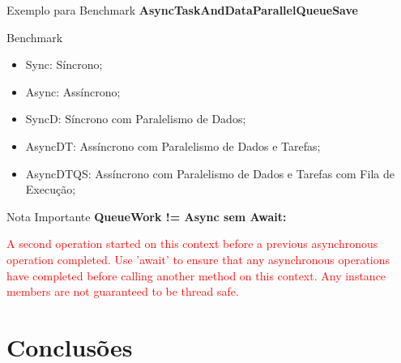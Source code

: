 \documentclass[10pt]{beamer}
\begin{document}
\begin{frame}{Exemplo para Benchmark}
	\textbf{AsyncTaskAndDataParallelQueueSave}
\end{frame}

\begin{frame}{Benchmark}
	\begin{figure}
	\end{figure}
	\vspace{-0.5cm}
	\scriptsize
	\begin{itemize}
		\item Sync: Síncrono;
		\item Async: Assíncrono;
		\item SyncD: Síncrono com Paralelismo de Dados;
		\item AsyncDT: Assíncrono com Paralelismo de Dados e Tarefas;
		\item AsyncDTQS: Assíncrono com Paralelismo de Dados e Tarefas com Fila de Execução;
	\end{itemize}
\end{frame}

\begin{frame}{Nota Importante}
	\textbf{QueueWork != Async sem Await:} 
	\vspace{0.3cm}
	
	\textcolor{red}{A second operation started on this context before a previous asynchronous operation completed. Use 'await' to ensure that any asynchronous operations have completed before calling another method on this context. Any instance members are not guaranteed to be thread safe.}
\end{frame}

\section{Conclusões}
\end{document}
